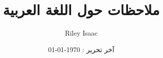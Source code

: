 \documentclass[12pt,a4paper]{article}
\title{ ملاحظات حول اللغة العربية }
\author{Riley Isaac}
\date{آخر تحرير : \today }
\begin{document}
\maketitle

\begin{french}
\end{french}
\end{document}
